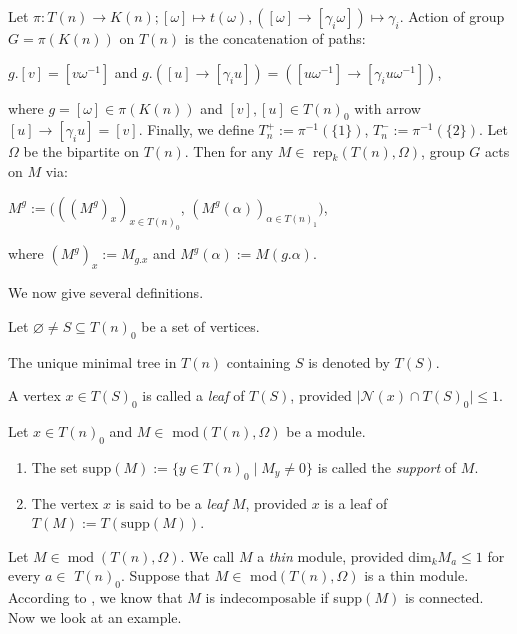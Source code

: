\documentclass[a4paper,12pt]{amsart}
\let\emptyset\varnothing
\DeclareMathOperator{\modd}{mod}
\let\emptyset\varnothing
\newenvironment{Definition}[1][Definition.]{\begin{trivlist}
\item[\hskip \labelsep {\bfseries #1}]}{\end{trivlist}}
\begin{document}
Let $\pi: T(n)\rightarrow K(n); [\omega] \mapsto t(\omega), ([\omega]\rightarrow [\gamma_i \omega]) \mapsto \gamma_i$.  Action of group $G=\pi(K(n))$ on $T(n)$ is the concatenation of paths: 
\begin{center}
$g.[v]=[v\omega^{-1}]$ and
$g.([u]\rightarrow[\gamma_iu])=([u\omega^{-1}]\rightarrow [\gamma_i u\omega^{-1}])$,
\end{center}
where  $g=[\omega]\in\pi(K(n))$ and $[v], [u]\in T(n)_0$ with arrow $[u]\rightarrow [\gamma_i u]=[v]$.
Finally, we define $T^+_{n}:=\pi^{-1}(\{1\})$, $T^-_n:=\pi^{-1}(\{2\})$.  Let $\Omega$ be the bipartite  on $T(n)$.  Then for any  $M\in$ rep$_k(T(n), \Omega)$,  group $G$ acts on $M$ via:
\begin{center}
$M^g:=(((M^g)_x)_{x\in T(n)_0}$, $(M^g(\alpha))_{\alpha\in T(n)_1})$,
\end{center}
where $(M^g)_x:= M_{g.x}$ and $M^g(\alpha):=M(g.\alpha)$. 

\quad


We now give several definitions.

\begin{Definition} Let $ \emptyset\neq S\subseteq T(n)_0$ be a set of vertices.
\item[$(a)$] The unique minimal tree in $T(n)$ containing $S$ is denoted by $T(S)$.

\item[$(b)$] A vertex $x\in T(S)_0$ is called a \textit{leaf} of $T(S)$,  provided $\mid \mathcal{N}(x)\cap T(S)_0\mid \leq 1$. 

\end{Definition}
\begin{Definition}
 Let $x\in T(n)_0$ and $M\in$ mod$(T(n), \Omega)$ be a module.
\begin{enumerate}
\item[$(a)$] The set supp$(M):=\{y\in T(n)_0\mid M_y\neq0\}$ is called the \textit{support} of $M$.



\item[$(b)$] The vertex $x$ is said to be a \textit{leaf} $M$,  provided $x$ is a leaf of $T(M):=T(\text{supp}(M))$. 

\end{enumerate} 
 
 
 \end{Definition}



Let $M\in\modd(T(n),\Omega)$. We call $M$ a \textit{thin} module, provided dim$_kM_a\leq 1$ for every $a\in$ $T(n)_0$. Suppose that $M\in$ mod$(T(n),\Omega)$ is a thin module. According to \cite[Proposition 1]{Claus3}, we know that $M$ is indecomposable if supp$(M)$ is connected. Now we look at an example.
\end{document}
